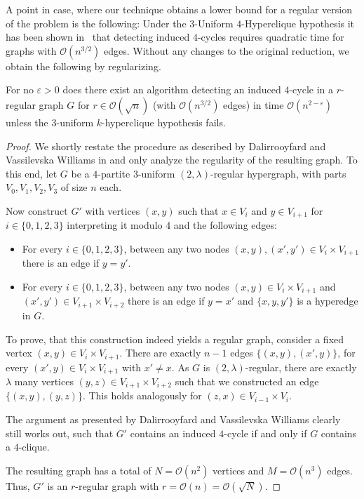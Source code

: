 \documentclass[a4paper,UKenglish,cleveref, autoref, thm-restate,numberwithinsect]{lipics-v2021}
\newcommand{\bigO}{\mathcal{O}}
\begin{document}
A point in case, where our technique obtains a lower bound for a regular version of the problem is the following:
Under the $3$-Uniform $4$-Hyperclique hypothesis it has been shown in~\cite{DalirrooyfardW22} that detecting induced $4$-cycles requires quadratic time for graphs with $\mathcal{O}(n^{3/2})$ edges.
Without any changes to the original reduction, we obtain the following by regularizing.
\begin{theorem}
    For no $\varepsilon > 0$ does there exist an algorithm detecting an induced $4$-cycle in a $r$-regular graph $G$ for $r \in \mathcal{O}(\sqrt n)$ (with $\mathcal{O}(n^{3/2})$ edges) in time $\mathcal{O}(n^{2 - \varepsilon})$ unless the $3$-uniform $k$-hyperclique hypothesis fails.
\end{theorem}
\begin{proof}
We shortly restate the procedure as described by Dalirrooyfard and {Vassilevska Williams} in \cite[Section 6]{DalirrooyfardW22} and only analyze the regularity of the resulting graph. 
To this end, let $G$ be a $4$-partite $3$-uniform $(2,\lambda)$-regular hypergraph, with parts $V_0,V_1,V_2,V_3$ of size $n$ each.

Now construct $G'$ with vertices $(x,y)$ such that $x \in V_i$ and $y \in V_{i+1}$ for $i \in \{0,1,2,3\}$ interpreting it modulo $4$ and the  following edges:
\begin{itemize}
    \item For every $i \in \{0,1,2,3\}$, between any two nodes $(x,y),(x',y') \in V_i \times V_{i+1}$ there is an edge if $y = y'$.
    \item For every $i \in\{0,1,2,3\}$, between any two nodes $(x,y) \in V_i \times V_{i+1}$ and $(x',y') \in V_{i+1} \times V_{i+2}$ there is an edge if $y = x'$ and $\{x,y,y'\}$ is a hyperedge in $G$.
\end{itemize}

To prove, that this construction indeed yields a regular graph, consider a fixed vertex $(x,y) \in V_i \times V_{i+1}$.
There are exactly $n-1$ edges $\{(x,y),(x',y)\}$, for every $(x',y) \in V_{i} \times V_{i+1}$ with $x' \neq x$.
As $G$ is $(2,\lambda)$-regular, there are exactly $\lambda$ many vertices $(y,z) \in V_{i+1} \times V_{i+2}$ such that we constructed an edge $\{(x,y),(y,z)\}$.
This holds analogously for $(z,x) \in V_{i-1} \times V_{i}$.

The argument as presented by Dalirrooyfard and {Vassilevska Williams} clearly still works out, such that $G'$ contains an induced $4$-cycle if and only if $G$ contains a $4$-clique.

The resulting graph has a total of $N = \bigO(n^2)$ vertices and $M = \bigO(n^3)$ edges.
Thus, $G'$ is an $r$-regular graph with $r = \mathcal{O}(n) = \mathcal{O}(\sqrt{N})$.
\end{proof}
\end{document}
